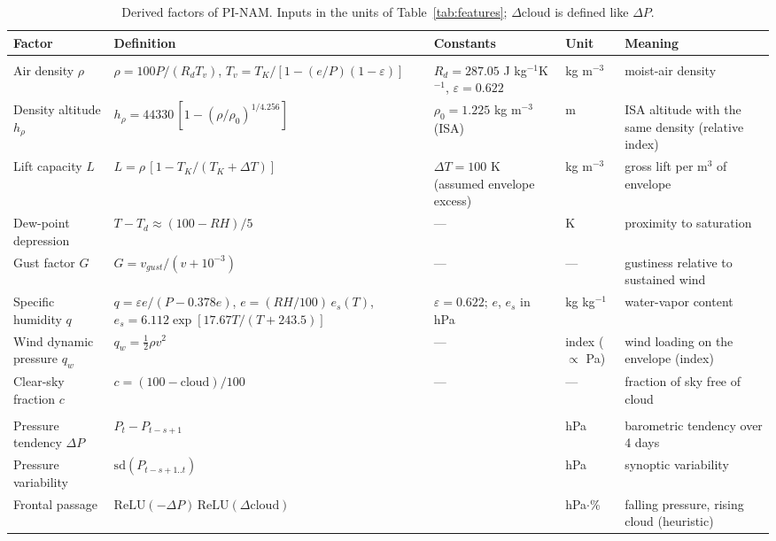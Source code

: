 \begin{table}[!ht]
\centering\footnotesize\linespread{1}\selectfont
\setlength{\tabcolsep}{3pt}
\caption{Derived factors of PI-NAM. Inputs in the units of Table~\ref{tab:features}; $\Delta$cloud is defined like $\Delta P$.}
\label{tab:physics}
\begin{tabular}{>{\raggedright\arraybackslash}p{2.7cm}>{\raggedright\arraybackslash}p{5.0cm}>{\raggedright\arraybackslash}p{2.9cm}>{\raggedright\arraybackslash}p{1.3cm}>{\raggedright\arraybackslash}p{2.9cm}}
\toprule
Factor & Definition & Constants & Unit & Meaning \\
\midrule
\multicolumn{5}{l}{\textit{Instantaneous}} \\
Air density $\rho$ & $\rho = 100P/(R_d T_v)$, $T_v = T_K/[1-(e/P)(1-\varepsilon)]$ & $R_d=287.05$ J kg$^{-1}$K$^{-1}$, $\varepsilon=0.622$ & kg m$^{-3}$ & moist-air density \\
Density altitude $h_\rho$ & $h_\rho = 44330\,[1-(\rho/\rho_0)^{1/4.256}]$ & $\rho_0=1.225$ kg m$^{-3}$ (ISA) & m & ISA altitude with the same density (relative index) \\
Lift capacity $L$ & $L = \rho\,[1 - T_K/(T_K+\Delta T)]$ & $\Delta T = 100$ K (assumed envelope excess) & kg m$^{-3}$ & gross lift per m$^3$ of envelope \\
Dew-point depression & $T - T_d \approx (100-RH)/5$ & — & K & proximity to saturation \\
Gust factor $G$ & $G = v_{gust}/(v + 10^{-3})$ & — & — & gustiness relative to sustained wind \\
Specific humidity $q$ & $q = \varepsilon e/(P - 0.378e)$, $e = (RH/100)\,e_s(T)$, $e_s = 6.112\exp[17.67T/(T+243.5)]$ & $\varepsilon=0.622$; $e$, $e_s$ in hPa & kg kg$^{-1}$ & water-vapor content \\
Wind dynamic pressure $q_w$ & $q_w = \frac{1}{2}\rho v^2$ & — & index ($\propto$ Pa) & wind loading on the envelope (index) \\
Clear-sky fraction $c$ & $c = (100 - \mathrm{cloud})/100$ & — & — & fraction of sky free of cloud \\
\multicolumn{5}{l}{\textit{Synoptic ($s=5$)}} \\
Pressure tendency $\Delta P$ & $P_t - P_{t-s+1}$ &  & hPa & barometric tendency over 4 days \\
Pressure variability & $\mathrm{sd}(P_{t-s+1..t})$ &  & hPa & synoptic variability \\
Frontal passage & $\mathrm{ReLU}(-\Delta P)\,\mathrm{ReLU}(\Delta\mathrm{cloud})$ &  & hPa$\cdot$\% & falling pressure, rising cloud (heuristic) \\

\end{tabular}
\end{table}
